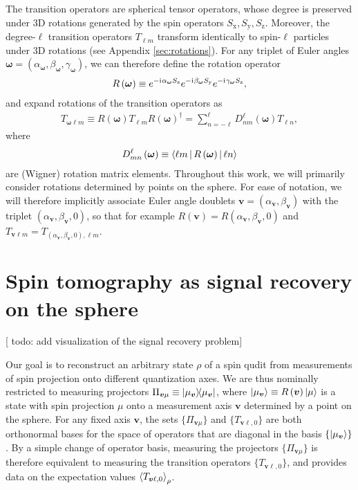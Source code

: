 \documentclass[notitlepage,twocolumn]{revtex4-2}
\newcommand{\p}[1]{\left(#1\right)} %
\newcommand{\bk}{\Braket} %
\renewcommand{\v}{\bm} %
\renewcommand{\i}{\mathrm{i}\mkern1mu} %
\renewcommand{\set}[1]{\{#1\}} %
\newcommand{\x}{\text{x}}
\newcommand{\y}{\text{y}}
\newcommand{\z}{\text{z}}
\newcommand{\red}[1]{{\color{red} #1}}
\begin{document}
The transition operators are spherical tensor operators, whose degree is preserved under 3D rotations generated by the spin operators $S_\x,S_\y,S_\z$.
Moreover, the degree-$\ell$ transition operators $T_{\ell m}$ transform identically to spin-$\ell$ particles under 3D rotations (see Appendix \ref{sec:rotations}).
For any triplet of Euler angles $\v\omega=\p{\alpha_{\v\omega},\beta_{\v\omega},\gamma_{\v\omega}}$, we can therefore define the rotation operator
\begin{align}
  R\p{\v\omega} \equiv e^{-\i\alpha_{\v\omega}S_\z} e^{-\i\beta_{\v\omega}S_\y} e^{-\i\gamma_{\v\omega}S_\z},
\end{align}
and expand rotations of the transition operators as
\begin{align}
  T_{\v\omega\ell m} \equiv
  R\p{\v\omega} T_{\ell m} R\p{\v\omega}^\dag
  = \sum_{n=-\ell}^\ell D_{nm}^\ell\p{\v\omega} T_{\ell n},
  \label{eq:trans_rot}
\end{align}
where
\begin{align}
  D_{mn}^\ell\p{\v\omega} \equiv \bk{\ell m|R\p{\v\omega}|\ell n}
\end{align}
are (Wigner) rotation matrix elements.
Throughout this work, we will primarily consider rotations determined by points on the sphere.
For ease of notation, we will therefore implicitly associate Euler angle doublets $\v v=\p{\alpha_{\v v},\beta_{\v v}}$ with the triplet $\p{\alpha_{\v v},\beta_{\v v},0}$, so that for example $R\p{\v v} = R\p{\alpha_{\v v},\beta_{\v v},0}$ and $T_{\v v\ell m} = T_{\p{\alpha_{\v v},\beta_{\v v},0},\ell m}$.

\section{Spin tomography as signal recovery on the sphere}
\label{sec:signal_recovery}

[\red{todo: add visualization of the signal recovery problem}]

Our goal is to reconstruct an arbitrary state $\rho$ of a spin qudit from measurements of spin projection onto different quantization axes.
We are thus nominally restricted to measuring projectors $\Pi_{\v v\mu} \equiv \op{\mu_{\v v}}$, where $\ket{\mu_{\v v}}\equiv R\p{\v v}\ket{\mu}$ is a state with spin projection $\mu$ onto a measurement axis $\v v$ determined by a point on the sphere.
For any fixed axis $\v v$, the sets $\set{\Pi_{\v v\mu}}$ and $\set{T_{\v v\ell,0}}$ are both orthonormal bases for the space of operators that are diagonal in the basis $\set{\ket{\mu_{\v v}}}$.
By a simple change of operator basis, measuring the projectors $\set{\Pi_{\v v\mu}}$ is therefore equivalent to measuring the transition operators $\set{T_{\v v\ell,0}}$, and provides data on the expectation values $\bk{T_{\v v\ell,0}}_\rho$.
\end{document}
